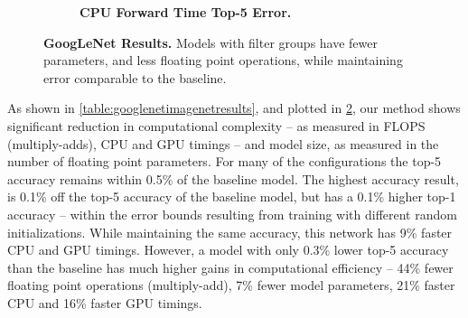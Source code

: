 \documentclass[thesis]{subfiles}
\begin{document}
\begin{figure}[tbp]
\begin{subfigure}[b]{\linewidth}
			\centering
			\caption{\textbf{CPU Forward Time \vs Top-5 Error.}}
			\label{fig:googlenet50cpuforward}
		\end{subfigure}
		
		\caption{\textbf{GoogLeNet Results.} Models with filter groups have fewer parameters, and less floating point operations, while maintaining error comparable to the baseline.}
		\label{fig:googlenet50plots}
	\end{figure}
	
	As shown in \cref{table:googlenetimagenetresults}, and plotted in \cref{fig:googlenet50plots}, our method shows significant reduction in computational complexity -- as measured in FLOPS (multiply-adds), CPU and GPU timings -- and model size, as measured in the number of floating point parameters. For many of the configurations the top-5 accuracy remains within 0.5\% of the baseline model. 
	The highest accuracy result, is 0.1\% off the top-5 accuracy of the baseline model, but has a 0.1\% higher top-1 accuracy -- within the error bounds resulting from training with different random initializations. While maintaining the same accuracy, this network has 9\% faster CPU and GPU timings. However, a model with only 0.3\% lower top-5 accuracy than the baseline has much higher gains in computational efficiency -- 44\% fewer floating point operations (multiply-add), 7\% fewer model parameters, 21\% faster CPU and 16\% faster GPU timings.
	
\end{document}
